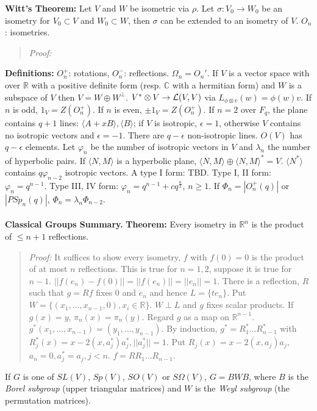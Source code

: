 {\bf Witt's Theorem:} Let $V$ and $W$ 
be isometric via $\rho$.  Let $\sigma: V_0 \rightarrow W_0$ be
an isometry for $V_0 \subset V$ and $W_0 \subset W$, then $\sigma$ can 
be extended to an isometry of $V$. $O_n$: isometries.  
\begin{quote}
\emph{Proof:}
\end{quote}
{\bf Definitions:} $O_n^+$: rotations,
$O_n^-$: reflections.
$\Omega_n= O_n'$.
If $V$ is a vector space with over ${\mathbb {R}}$ with a positive definite form 
(resp. ${\mathbb {C}}$ with a 
hermitian form) and $W$ is a subspace of $V$ then $V=W \oplus W^{\perp}$.
$V^* \otimes V \rightarrow {\cal L}(V,V)$ via $L_{\phi \otimes v } (w)= \phi(w)v$.
If $n$ is odd, $1_V = Z(O_n^+)$.  
If $n$ is even, $\pm 1_V =Z(O_n^+)$. If $n=2$ over $F_q$, the plane contains
$q+1$ lines: $\langle A+xB \rangle, \langle B \rangle$; if $V$ is isotropic, 
$\epsilon= 1$, otherwise
$V$ contains no isotropic vectors and $\epsilon = -1$.  There are $q - \epsilon$
non-isotropic lines.  $O(V)$ has $q - \epsilon$ elements.  
Let $\varphi_n$ be the number of
isotropic vectors in $V$ and $\lambda_n$ the
number of hyperbolic pairs.  If $\langle N,M \rangle$ is a hyperbolic plane, 
$\langle N,M \rangle \oplus \langle N,M \rangle^* = V$.
$\langle N^* \rangle$ contains $q \varphi_{n-2}$ isotropic vectors.  
A type I form: TBD.
Type I, II form:
$\varphi_{n}=q^{n-1}$.
Type III, IV form: $\varphi_n= q^{n-1} + c q^{\frac n 2}$, $n \ge 1$.
If $\Phi_n = |O_n^+(q)|$ or $|PSp_n(q)|$, $\Phi_n= \lambda_n \Phi_{n-2}$.
\\
\\
{\bf Classical Groups Summary.}
{\bf Theorem:}
Every isometry in ${\mathbb R}^n$ is the product of $\leq n+1$ reflections.
\begin{quote}
\emph{Proof:}
It suffices to show every isometry, $f$ with $f(0)=0$ is the product of at most $n$ reflections.
This is true for $n= 1,2$,  suppose it is true for $n-1$.
$||f(e_n)-f(0)||= ||f(e_n)||= ||e_n||= 1$.  There is a reflection, $R$ such that $g=Rf$ fixes 
$0$ and $e_n$ and hence $L= \{ t e_n \}$.  Put $W= \{ (x_1, \ldots, x_{n-1},0), x_i \in {\mathbb R} \}$.
$W \perp L$ and $g$ fixes scalar products.  If $g(x)=y$, $\pi_n(x)= \pi_n(y)$.  Regard $g$ as
a map on ${\mathbb R}^{n-1}$.  $g^*(x_1, \ldots, x_{n-1})= (y_1, \ldots , y_{n-1})$.  By induction,
$g^*= R_1^* \ldots R_{n-1}^*$ with $R_j^*(x)= x- 2(x, a_j^*) a_j^*, ||a_j^*||=1$.  Put
$R_j(x)= x- 2(x, a_j) a_j$, $a_n=0, a_j^*=a_j, j<n$.  $f= R R_1 \ldots R_{n-1}$.
\end{quote}
If $G$ is one of $SL(V)$, $Sp(V)$, $SO(V)$ or $S\Omega(V)$, $G=BWB$, where
$B$ is the \emph{Borel subgroup} (upper triangular matrices) and $W$ is the 
\emph{Weyl subgroup}
(the permutation matrices).
